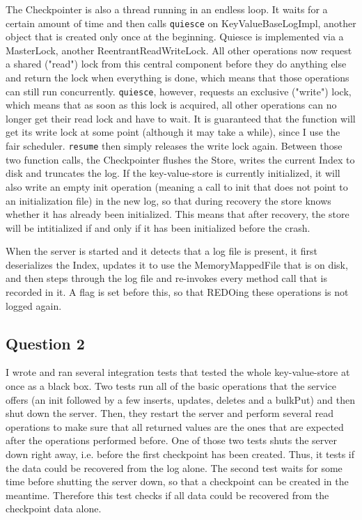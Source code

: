 \documentclass[12pt,a4paper]{article}
\begin{document}
The Checkpointer is also a thread running in an endless loop. It waits for a certain amount of time and then calls \texttt{quiesce} on KeyValueBaseLogImpl, another object that is created only once at the beginning. Quiesce is implemented via a MasterLock, another ReentrantReadWriteLock. All other operations now request a shared ("read") lock from this central component before they do anything else and return the lock when everything is done, which means that those operations can still run concurrently. \texttt{quiesce}, however, requests an exclusive ("write") lock, which means that as soon as this lock is acquired, all other operations can no longer get their read lock and have to wait. It is guaranteed that the function will get its write lock at some point (although it may take a while), since I use the fair scheduler. \texttt{resume} then simply releases the write lock again. Between those two function calls, the Checkpointer flushes the Store, writes the current Index to disk and truncates the log. If the key-value-store is currently initialized, it will also write an empty init operation (meaning a call to init that does not point to an initialization file) in the new log, so that during recovery the store knows whether it has already been initialized. This means that after recovery, the store will be intitialized if and only if it has been initialized before the crash.

When the server is started and it detects that a log file is present, it first deserializes the Index, updates it to use the MemoryMappedFile that is on disk, and then steps through the log file and re-invokes every method call that is recorded in it. A flag is set before this, so that REDOing these operations is not logged again.


\subsection*{Question 2}
\label{sec:pq2}
I wrote and ran several integration tests that tested the whole key-value-store at once as a black box. Two tests run all of the basic operations that the service offers (an init followed by a few inserts, updates, deletes and a bulkPut) and then shut down the server. Then, they restart the server and perform several read operations to make sure that all returned values are the ones that are expected after the operations performed before. One of those two tests shuts the server down right away, i.e. before the first checkpoint has been created. Thus, it tests if the data could be recovered from the log alone. The second test waits for some time before shutting the server down, so that a checkpoint can be created in the meantime. Therefore this test checks if all data could be recovered from the checkpoint data alone.
\end{document}
